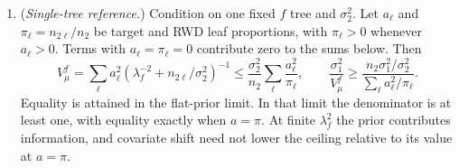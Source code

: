\begin{thmA}
\begin{enumerate}[label=(\alph*),leftmargin=2.2em]
For fixed $B$ and $m\to\infty$, every $V^{(b)}\to V_*$ almost surely. On a finite grid avoiding equality $\ess_0(V_*;s)=N_{\rm target}$ and containing an admissible point, selection by \eqref{eqA:prrule} eventually equals the smallest admissible grid value.
For fixed $m$ and $B\to\infty$, suppose $U_b>0$ almost surely and $u_m=\E U_b>0$. Put $\gamma=V_*/u_m$ and
\[
G_m(s)=P\{\ess_0(\gamma U_b;s)\le N_{\rm target}\}.
\]
At any $s$ for which $P\{\ess_0(\gamma U_b;s)=N_{\rm target}\}=0$, $\widehat G(s)\to G_m(s)$ almost surely. On a finite grid satisfying this condition, with $G_m(s)\ne q$ at every point and at least one $G_m(s)>q$, the empirical and population grid selections eventually agree.
\item (\emph{Single-tree reference.}) Condition on one fixed $f$ tree and $\sigma_2^2$. Let $a_\ell$ and $\pi_\ell=n_{2\ell}/n_2$ be target and RWD leaf proportions, with $\pi_\ell>0$ whenever $a_\ell>0$. Terms with $a_\ell=\pi_\ell=0$ contribute zero to the sums below. Then
\[
V_\mu^f=\sum_\ell a_\ell^2(\lambda_f^{-2}+n_{2\ell}/\sigma_2^2)^{-1}
\le\frac{\sigma_2^2}{n_2}\sum_\ell\frac{a_\ell^2}{\pi_\ell},\qquad
\frac{\sigma_1^2}{V_\mu^f}\ge\frac{n_2\sigma_1^2/\sigma_2^2}{\sum_\ell a_\ell^2/\pi_\ell}.
\]
Equality is attained in the flat-prior limit. In that limit the denominator is at least one, with equality exactly when $a=\pi$. At finite $\lambda_f^2$ the prior contributes information, and covariate shift need not lower the ceiling relative to its value at $a=\pi$.
\end{enumerate}
\end{thmA}

